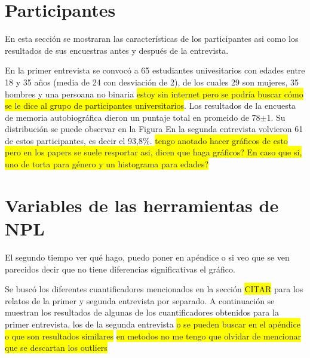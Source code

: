 \section{Participantes}
En esta sección se mostraran las características de los participantes asi como los resultados de sus encuestras antes y después de la entrevista.

En la primer entrevista se convocó a 65 estudiantes univesitarios con edades entre 18 y 35 años (media de 24 con desviación de 2), de los cuales 29 son mujeres, 35 hombres y una persoana no binaria \colorbox{yellow}{estoy sin internet pero se podría buscar cómo se le dice al grupo de participantes universitarios}. Los resultados de la encuesta de memoria autobiográfica dieron un puntaje total en promeido de 78$\pm$1. Su distribución se puede observar en la Figura En la segunda entrevista volvieron 61 de estos participantes, es decir el 93,8$\%$. \colorbox{yellow}{tengo anotado hacer gráficos de esto pero en los papers se suele resportar asi, dicen que haga gráficos? En caso que si, uno de torta para género y un histograma para edades?}

\section{Variables de las herramientas de NPL}
 
 El segundo tiempo ver qué hago, puedo poner en apéndice o si veo que se ven parecidos decir que no tiene diferencias significativas el gráfico.

Se buscó los diferentes cuantificadores mencionados en la sección \colorbox{yellow}{CITAR} para los relatos de la primer y segunda entrevista por separado. A continuación se muestran los resultados de algunas de los cuantificadores obtenidos para la primer entrevista, los de la segunda entrevista \colorbox{yellow}{o se pueden buscar en el apéndice o que son resultados similares} \colorbox{yellow}{en metodos no me tengo que olvidar de mencionar que se descartan los outliers}

